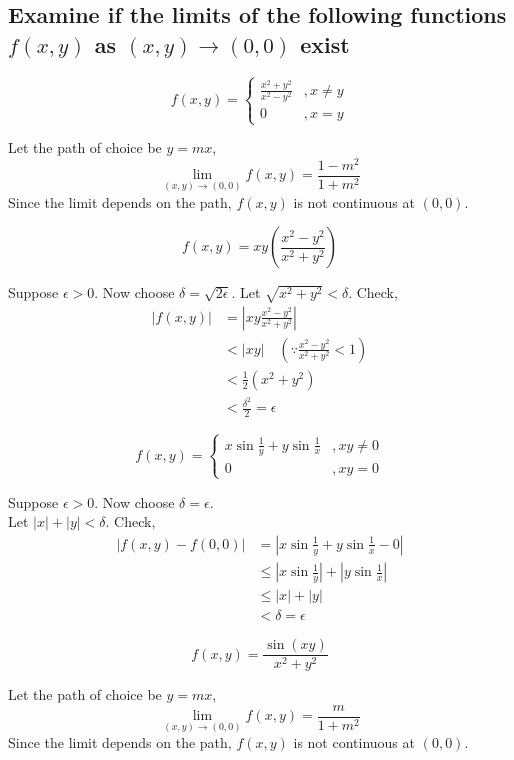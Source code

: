 \subsection{Examine if the limits of the following functions $f(x,y)$ as $(x,y)\to(0,0)$ exist}
\begin{asign}
	\[f(x,y)=\begin{cases}
		\frac{x^2+y^2}{x^2-y^2} &, x\neq y\\
		0 &, x=y
	\end{cases}\]
\end{asign}
\begin{anse}
	Let the path of choice be $y=mx$,
	\[\lim\limits_{(x,y)\to(0,0)}f(x,y)=\frac{1-m^2}{1+m^2}\]
	Since the limit depends on the path, $f(x,y)$ is not continuous at $(0,0)$.
\end{anse}
\begin{asign}
	\[f(x,y)=xy\left(\frac{x^2-y^2}{x^2+y^2}\right)\]
\end{asign}
\begin{anse}
	Suppose $\epsilon>0$. Now choose $\delta=\sqrt{2\epsilon}$.
	Let $\sqrt{x^2+y^2}<\delta$. Check,
	\[\begin{split}
		|f(x,y)|&=|xy\frac{x^2-y^2}{x^2+y^2}|\\
		&<|xy| \quad \left(\because \frac{x^2-y^2}{x^2+y^2}<1\right)\\
		&<\frac{1}{2}(x^2+y^2)\\
		&<\frac{\delta^2}{2}=\epsilon
	\end{split}\]
\end{anse}
\begin{asign}
	\[f(x,y)=\begin{cases}
		x\sin\frac{1}{y}+y\sin\frac{1}{x} &, xy\neq0\\
		0 &, xy=0
	\end{cases}\]
\end{asign}
\begin{anse}
		Suppose $\epsilon>0$. Now choose $\delta=\epsilon$.\\
	Let $|x|+|y|<\delta$. Check,
	\[\begin{split}
		|f(x,y)-f(0,0)|&=|x\sin\frac{1}{y}+y\sin\frac{1}{x} -0|\\
		&\leq | x\sin\frac{1}{y}|+|y\sin\frac{1}{x} |\\
		&\leq |x|+|y|\\
		&< \delta=\epsilon
	\end{split}\]
\end{anse}
\begin{asign}
	\[f(x,y)=\frac{\sin(xy)}{x^2+y^2}\]
\end{asign}
\begin{anse}
	Let the path of choice be $y=mx$,
	\[\lim\limits_{(x,y)\to(0,0)}f(x,y)=\frac{m}{1+m^2}\]
	Since the limit depends on the path, $f(x,y)$ is not continuous at $(0,0)$.
\end{anse}
